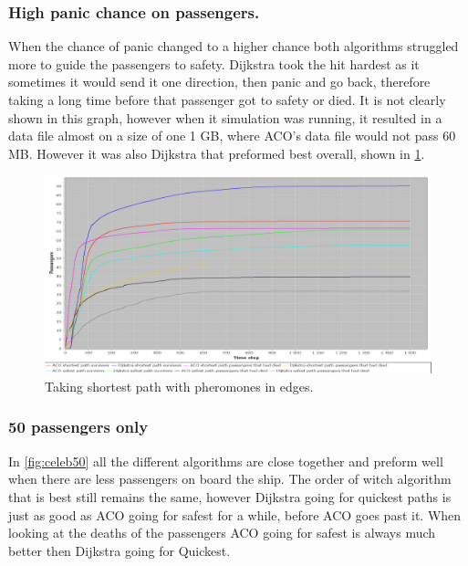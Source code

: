 \subsubsection{High panic chance on passengers.}
When the chance of panic changed to a higher chance both algorithms struggled more to guide the passengers to safety. Dijkstra took the hit hardest as it sometimes it would send it one direction, then panic and go back, therefore taking a long time before that passenger got to safety or died. It is not clearly shown in this graph, however when it simulation was running, it resulted in a data file almost on a size of one 1 GB, where ACO's data file would not pass 60 MB. However it was also Dijkstra that preformed best overall, shown in \ref{fig:celebHPanic}.

\begin{figure} [float]
\centering
\hspace*{-1.0in}
\includegraphics[scale=0.35]{images/Graph-using-200-rounds-140-passangers-and-one-fire-high-panic.png}
\caption{Taking shortest path with pheromones in edges.}
\label{fig:celebHPanic}
\end{figure}


\subsubsection{50 passengers only}

In \ref{fig:celeb50} all the different algorithms are close together and preform well when there are less passengers on board the ship. The order of witch algorithm that is best still remains the same, however Dijkstra going for quickest paths is just as good as ACO going for safest for a while, before ACO goes past it. When looking at the deaths of the passengers ACO going for safest is always much better then Dijkstra going for Quickest.

